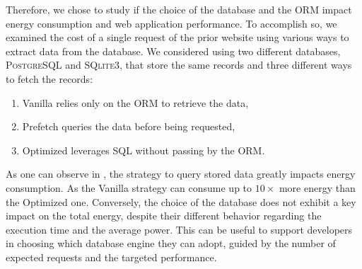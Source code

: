 Therefore, we chose to study if the choice of the database and the ORM impact energy consumption and web application performance.
To accomplish so, we examined the cost of a single request of the prior website using various ways to extract data from the database.
We considered using two different databases, \textsc{PostgreSQL} and \textsc{SQlite3}, that store the same records and three different ways to fetch the records:
\begin{enumerate}
    \item \textsf{Vanilla} relies only on the ORM to retrieve the data,
    \item \textsf{Prefetch} queries the data before being requested,
    \item \textsf{Optimized} leverages SQL without passing by the ORM.
\end{enumerate}

As one can observe in , the strategy to query stored data greatly impacts energy consumption.
As the \textsf{Vanilla} strategy can consume up to $10\times$ more energy than the \textsf{Optimized} one.
Conversely, the choice of the database does not exhibit a key impact on the total energy, despite their different behavior regarding the execution time and the average power.
This can be useful to support developers in choosing which database engine they can adopt, guided by the number of expected requests and the targeted performance.

